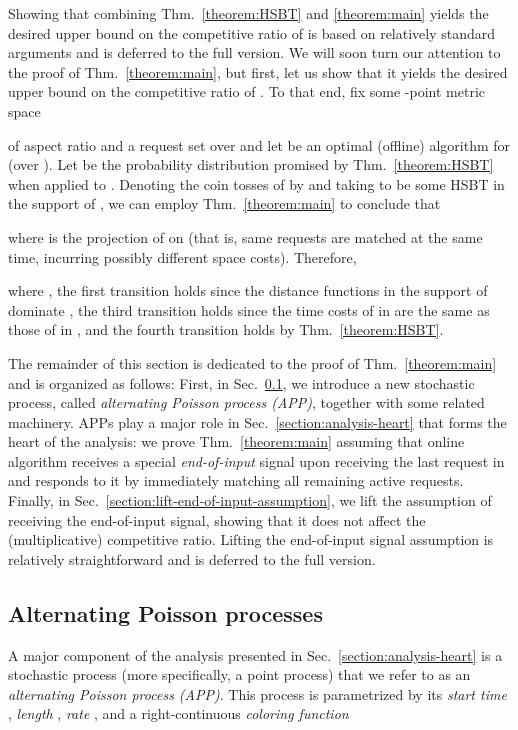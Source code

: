 \documentclass[11pt]{article}
\def\LongVersion{}
\def\LongVersionEnd{}
\def\ShortVersion{}
\def\ShortVersionEnd{}
\theoremstyle{definition}
\theoremstyle{plain}
\theoremstyle{definition}
\theoremstyle{plain}
\theoremstyle{definition}
\theoremstyle{plain}
\newcommand{\Sect}{Sec.}
\newcommand{\Thm}{Thm.}
\begin{document}
\ShortVersion Showing that combining \Thm{}\ \ref{theorem:HSBT} and \ref{theorem:main}
yields the desired upper bound on the competitive ratio of  is based on
relatively standard arguments and is deferred to the full version.
\ShortVersionEnd \LongVersion We will soon turn our attention to the proof of \Thm{}~\ref{theorem:main},
but first, let us show that it yields the desired upper bound on the
competitive ratio of .
To that end, fix some -point metric space

of aspect ratio  and a request set  over  and let
 be an optimal (offline) algorithm for  (over
).
Let  be the probability distribution promised by
\Thm{}~\ref{theorem:HSBT} when applied to .
Denoting the coin tosses of  by  and taking  to be some
HSBT in the support of , we can employ \Thm{}~\ref{theorem:main}
to conclude that

where  is the projection of  on 
(that is, same requests are matched at the same time, incurring possibly
different space costs).
Therefore,

where
,
the first transition holds since the distance functions in the
support of  dominate ,
the third transition holds since the time costs of
 in  are the same as those of  in
, and
the fourth transition holds by \Thm{}~\ref{theorem:HSBT}.
\par
\LongVersionEnd The remainder of this section is dedicated to the proof of
\Thm{}~\ref{theorem:main} and is organized as follows:
First, in \Sect{}~\ref{section:alternating-Poisson-process}, we introduce a
new stochastic process, called \emph{alternating Poisson process (APP)},
together with some related machinery.
APPs play a major role in \Sect{}~\ref{section:analysis-heart} that forms the
heart of the analysis:
we prove \Thm{}~\ref{theorem:main} assuming that online algorithm 
receives a special \emph{end-of-input} signal upon receiving the last request
in  and responds to it by immediately matching all remaining active
requests.
\LongVersion Finally, in \Sect{}~\ref{section:lift-end-of-input-assumption}, we lift the
assumption of receiving the end-of-input signal, showing that it does not
affect the (multiplicative) competitive ratio.
\LongVersionEnd \ShortVersion Lifting the end-of-input signal assumption is relatively straightforward and
is deferred to the full version.
\ShortVersionEnd 

\subsection{Alternating Poisson processes}
\label{section:alternating-Poisson-process}
A major component of the analysis presented in
\Sect{}~\ref{section:analysis-heart} is a stochastic process (more
specifically, a point process) that we refer to as an \emph{alternating
Poisson process (APP)}.
This process is parametrized by its
\emph{start time} ,
\emph{length} ,
\emph{rate} , and
a right-continuous \emph{coloring function}
\end{document}
